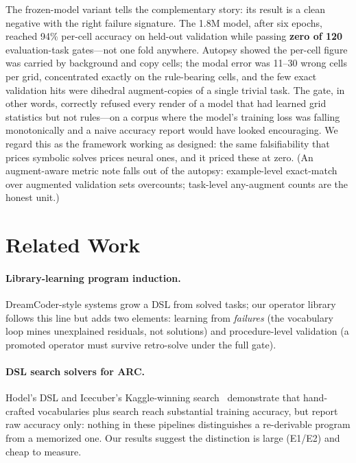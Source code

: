 \documentclass[11pt]{article}
\begin{document}
The frozen-model variant tells the complementary story: its result is a
clean negative with the right failure signature.  The 1.8M model, after six
epochs, reached 94\% per-cell accuracy on held-out validation while passing
\textbf{zero of 120} evaluation-task gates---not one fold anywhere.
Autopsy showed the per-cell figure was carried by background and copy
cells; the modal error was 11--30 wrong cells per grid, concentrated
exactly on the rule-bearing cells, and the few exact validation hits were
dihedral augment-copies of a single trivial task.  The gate, in other
words, correctly refused every render of a model that had learned grid
statistics but not rules---on a corpus where the model's training loss was
falling monotonically and a naive accuracy report would have looked
encouraging.  We regard this as the framework working as designed: the same
falsifiability that prices symbolic solves prices neural ones, and it
priced these at zero.  (An augment-aware metric note falls out of the
autopsy: example-level exact-match over augmented validation sets
overcounts; task-level any-augment counts are the honest unit.)

\section{Related Work}

\paragraph{Library-learning program induction.}
DreamCoder-style systems grow a DSL from solved tasks; our operator library
follows this line but adds two elements: learning from \emph{failures} (the
vocabulary loop mines unexplained residuals, not solutions) and
procedure-level validation (a promoted operator must survive retro-solve
under the full gate).

\paragraph{DSL search solvers for ARC.}
Hodel's DSL and Icecuber's Kaggle-winning search~\citep{hodel2023dsl,
icecuber2020arc} demonstrate that hand-crafted vocabularies plus search
reach substantial training accuracy, but report raw accuracy only: nothing
in these pipelines distinguishes a re-derivable program from a memorized
one.  Our results suggest the distinction is large (E1/E2) and cheap to
measure.
\end{document}
